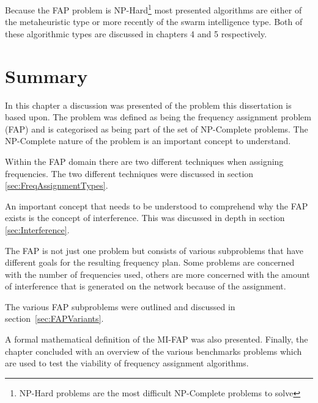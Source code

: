 Because the FAP problem is NP-Hard\footnote{NP-Hard problems are the most difficult NP-Complete problems to solve\cite{AIModernApproach}} most presented algorithms are either of the metaheuristic type or more recently of the swarm intelligence type. Both of these algorithmic types are discussed in chapters 4 and 5 respectively.
\section{Summary}
In this chapter a discussion was presented of the problem this dissertation is based upon. The problem was defined as being the frequency assignment problem (FAP) and is categorised as being part of the set of NP-Complete problems. The NP-Complete nature of the problem is an important concept to understand.

Within the FAP domain there are two different techniques when assigning frequencies. The two different techniques were discussed in section \ref{sec:FreqAssignmentTypes}. 

An important concept that needs to be understood to comprehend why the FAP exists is the concept of interference. This was discussed in depth in section \ref{sec:Interference}.

The FAP is not just one problem but consists of various subproblems that have different goals for the resulting frequency plan. Some problems are concerned with the number of frequencies used, others are more concerned with the amount of interference that is generated on the network because of the assignment.

The various FAP subproblems were outlined and discussed in section~\ref{sec:FAPVariants}.

A formal mathematical definition of the MI-FAP was also presented. Finally, the chapter concluded with an overview of the various benchmarks problems which are used to test the viability of frequency assignment algorithms.
